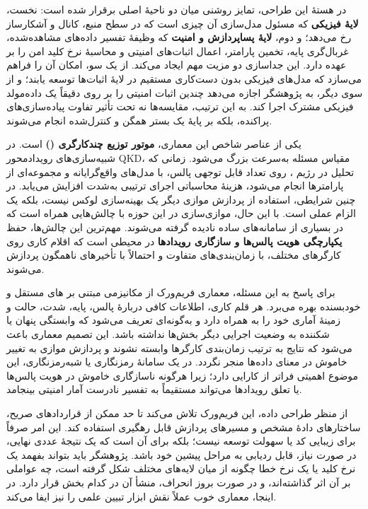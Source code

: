 \begin{sloppypar}
در هستهٔ این طراحی، تمایز روشنی میان دو ناحیهٔ اصلی برقرار شده است: نخست، \textbf{لایهٔ فیزیکی} که مسئول مدل‌سازی آن چیزی است که در سطح منبع، کانال و آشکارساز رخ می‌دهد؛ و دوم، \textbf{لایهٔ پساپردازش و امنیت} که وظیفهٔ تفسیر داده‌های مشاهده‌شده، غربال‌گری پایه، تخمین پارامتر، اعمال اثبات‌های امنیتی و محاسبهٔ نرخ کلید امن را بر عهده دارد. این جداسازی دو مزیت مهم ایجاد می‌کند. از یک سو، امکان آن را فراهم می‌سازد که مدل‌های فیزیکی بدون دست‌کاری مستقیم در لایهٔ اثبات‌ها توسعه یابند؛ و از سوی دیگر، به پژوهشگر اجازه می‌دهد چندین اثبات امنیتی را بر روی دقیقاً یک داده‌مولد فیزیکی مشترک اجرا کند. به این ترتیب، مقایسه‌ها نه تحت تأثیر تفاوت پیاده‌سازی‌های پراکنده، بلکه بر پایهٔ یک بستر همگن و کنترل‌شده انجام می‌شوند.

یکی از عناصر شاخص این معماری، \textbf{موتور توزیع چندکارگری ()} است. در شبیه‌سازی‌های رویدادمحور QKD، مقیاس مسئله به‌سرعت بزرگ می‌شود. زمانی که تحلیل در رژیم ، روی تعداد قابل توجهی پالس، با مدل‌های واقع‌گرایانه و مجموعه‌ای از پارامترها انجام می‌شود، هزینهٔ محاسباتی اجرای ترتیبی به‌شدت افزایش می‌یابد. در چنین شرایطی، استفاده از پردازش موازی دیگر یک بهینه‌سازی لوکس نیست، بلکه یک الزام عملی است. با این حال، موازی‌سازی در این حوزه با چالش‌هایی همراه است که در بسیاری از سامانه‌های ساده نادیده گرفته می‌شوند. مهم‌ترین این چالش‌ها، حفظ \textbf{یکپارچگی هویت پالس‌ها و سازگاری رویدادها} در محیطی است که اقلام کاری روی کارگرهای مختلف، با زمان‌بندی‌های متفاوت و احتمالاً با تأخیرهای ناهمگون پردازش می‌شوند.

برای پاسخ به این مسئله، معماری فریم‌ورک از مکانیزمی مبتنی بر های مستقل و خودبسنده بهره می‌برد. هر قلم کاری، اطلاعات کافی دربارهٔ پالس، پایه، شدت، حالت و زمینهٔ آماری خود را به همراه دارد و به‌گونه‌ای تعریف می‌شود که وابستگی پنهان یا شکننده به وضعیت اجرایی دیگر بخش‌ها نداشته باشد. این تصمیم معماری باعث می‌شود که نتایج به ترتیب زمان‌بندی کارگرها وابسته نشوند و پردازش موازی به تغییر خاموش در معنای داده‌ها منجر نگردد. در یک سامانهٔ رمزنگاری یا شبه‌رمزنگاری، این موضوع اهمیتی فراتر از کارایی دارد؛ زیرا هرگونه ناسازگاری خاموش در هویت پالس‌ها یا تعلق رویدادها می‌تواند مستقیماً به تفسیر نادرست آمار امنیتی بینجامد.

از منظر طراحی داده، این فریم‌ورک تلاش می‌کند تا حد ممکن از قراردادهای صریح، ساختارهای دادهٔ مشخص و مسیرهای پردازش قابل رهگیری استفاده کند. این امر صرفاً برای زیبایی کد یا سهولت توسعه نیست؛ بلکه برای آن است که یک نتیجهٔ عددی نهایی، در صورت نیاز، قابل ردیابی به مراحل پیشین خود باشد. پژوهشگر باید بتواند بفهمد یک نرخ کلید یا یک نرخ خطا چگونه از میان لایه‌های مختلف شکل گرفته است، چه عواملی بر آن اثر گذاشته‌اند، و در صورت بروز انحراف، منشأ آن در کدام بخش قرار دارد. در اینجا، معماری خوب عملاً نقش ابزار تبیین علمی را نیز ایفا می‌کند.


\end{sloppypar}
